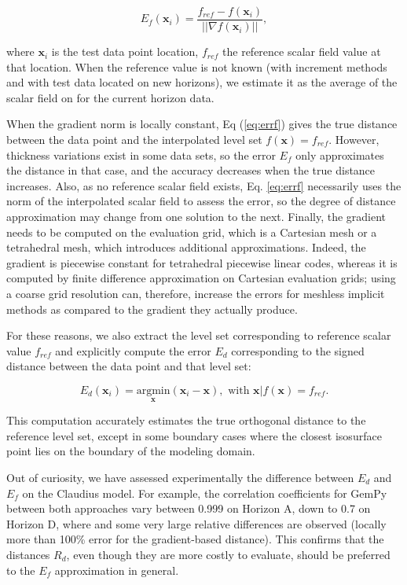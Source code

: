 \documentclass[preprint]{ring20}
\newcommand{\bx}{\mathbf{x}}
\begin{document}
\begin{equation}
\label{eq:errf}
E_f(\bx_i) = \frac{f_{ref} - f(\bx_i)}{||\nabla f(\bx_i)||},
\end{equation}

\noindent where $\bx_i$ is the test data point location, $f_{ref}$ the reference scalar field value at that location. When the reference value is not known (with increment methods and with test data located on new horizons), we estimate it as the average of the scalar field on for the current horizon data. 

When the gradient norm is locally constant, Eq (\ref{eq:errf}) gives the true distance between the data point and the interpolated level set $f(\bx) = f_{ref}$. However, thickness variations exist in some data sets, so the error $E_f$ only approximates the distance in that case, and the accuracy decreases when the true distance increases. Also, as no reference scalar field exists, Eq. \ref{eq:errf} necessarily uses the norm of the interpolated scalar field to assess the error, so the degree of distance approximation may change from one solution to the next. Finally, the gradient needs to be computed on the evaluation grid, which is a Cartesian mesh or a tetrahedral mesh, which introduces additional approximations. Indeed, the gradient is piecewise constant for tetrahedral piecewise linear codes, whereas it is computed by finite difference approximation on Cartesian evaluation grids; using a coarse grid resolution can, therefore, increase the errors for meshless implicit methods as compared to the gradient they actually produce.  

For these reasons, we also extract the level set corresponding to reference scalar value $f_{ref}$ and explicitly compute the error $E_d$ corresponding to the signed distance between the data point and that level set: 

\begin{equation}
\label{eq:errd}
E_d(\bx_i) = \underset{\bx}{\mathrm{argmin}} \left(\bx_i - \bx \right), \mbox{ with } \bx | f(\bx) = f_{ref}.
\end{equation}

This computation accurately estimates the true orthogonal distance to the reference level set, except in some boundary cases where the closest isosurface point lies on the boundary of the modeling domain.  

Out of curiosity, we have assessed experimentally the difference between $E_d$ and $E_f$ on the Claudius model. For example, the correlation coefficients for GemPy between both approaches vary between 0.999 on Horizon A, down to 0.7 on Horizon D, where and some very large relative differences are observed (locally  more than 100\% error for the gradient-based distance). This confirms that the distances $R_d$, even though they are more costly to evaluate, should be preferred to the $E_f$ approximation in general.  
\end{document}
